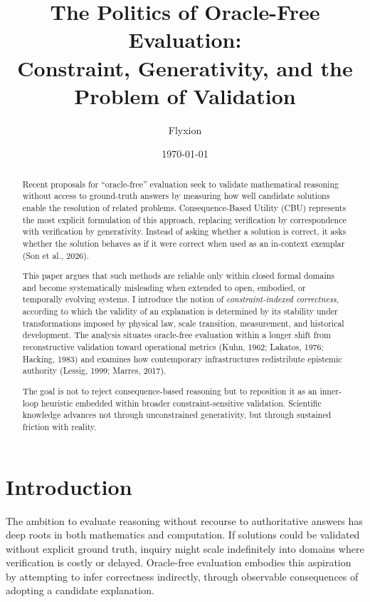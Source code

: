 \documentclass[12pt]{article}
\title{The Politics of Oracle-Free Evaluation:\\
Constraint, Generativity, and the Problem of Validation}
\author{Flyxion}
\date{\today}
\begin{document}
\maketitle

\begin{abstract}

Recent proposals for ``oracle-free'' evaluation seek to validate mathematical reasoning without access to ground-truth answers by measuring how well candidate solutions enable the resolution of related problems. Consequence-Based Utility (CBU) represents the most explicit formulation of this approach, replacing verification by correspondence with verification by generativity. Instead of asking whether a solution is correct, it asks whether the solution behaves as if it were correct when used as an in-context exemplar (Son et al., 2026).

This paper argues that such methods are reliable only within closed formal domains and become systematically misleading when extended to open, embodied, or temporally evolving systems. I introduce the notion of \emph{constraint-indexed correctness}, according to which the validity of an explanation is determined by its stability under transformations imposed by physical law, scale transition, measurement, and historical development. The analysis situates oracle-free evaluation within a longer shift from reconstructive validation toward operational metrics (Kuhn, 1962; Lakatos, 1976; Hacking, 1983) and examines how contemporary infrastructures redistribute epistemic authority (Lessig, 1999; Marres, 2017).

The goal is not to reject consequence-based reasoning but to reposition it as an inner-loop heuristic embedded within broader constraint-sensitive validation. Scientific knowledge advances not through unconstrained generativity, but through sustained friction with reality.

\end{abstract}

\section{Introduction}

The ambition to evaluate reasoning without recourse to authoritative answers has deep roots in both mathematics and computation. If solutions could be validated without explicit ground truth, inquiry might scale indefinitely into domains where verification is costly or delayed. Oracle-free evaluation embodies this aspiration by attempting to infer correctness indirectly, through observable consequences of adopting a candidate explanation.
\end{document}
